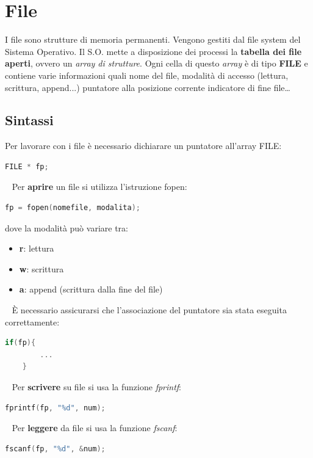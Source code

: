 \documentclass[a4paper,11pt,oneside]{book}
\begin{document}
\chapter{File}
I file sono strutture di memoria permanenti. Vengono gestiti dal file system del Sistema Operativo. 
Il S.O. mette a disposizione dei processi la \textbf{tabella dei file aperti}, ovvero un \emph{array di strutture}.
Ogni cella di questo \emph{array} è di tipo \textbf{FILE} e contiene varie informazioni quali nome del file, modalità di accesso 
(lettura, scrittura, append...) puntatore alla posizione corrente indicatore di fine file\dots



\section{Sintassi}
Per lavorare con i file è necessario dichiarare un puntatore all'array FILE:
\begin{lstlisting}[language=C]
    FILE * fp;
\end{lstlisting}

~\newline
Per \textbf{aprire} un file si utilizza l'istruzione fopen:
\begin{lstlisting}[language=C]
    fp = fopen(nomefile, modalita);
\end{lstlisting}
dove la modalità può variare tra:
\begin{itemize}
    \item \textbf{r}: lettura
    \item \textbf{w}: scrittura
    \item \textbf{a}: append (scrittura dalla fine del file)
\end{itemize}

~\newline
È necessario assicurarsi che l'associazione del puntatore sia stata eseguita correttamente:
\begin{lstlisting}[language=C]
    if(fp){
        ...
    }
\end{lstlisting}

~\newline 
Per \textbf{scrivere} su file si usa la funzione \emph{fprintf}:
\begin{lstlisting}[language=C]
    fprintf(fp, "%d", num);
\end{lstlisting}

~\newline 
Per \textbf{leggere} da file si usa la funzione \emph{fscanf}:
\begin{lstlisting}[language=C]
    fscanf(fp, "%d", &num);
\end{lstlisting}
\end{document}
